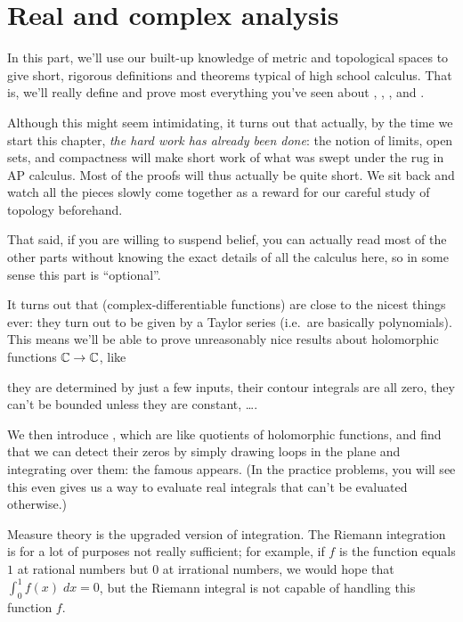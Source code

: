 \section{Real and complex analysis}
\begin{itemize}
In this part, we'll use our built-up knowledge of
metric and topological spaces to give short, rigorous definitions
and theorems typical of high school calculus.
That is, we'll really define and prove most everything you've seen about
, , , and .

Although this might seem intimidating,
it turns out that actually, by the time we start this chapter,
\emph{the hard work has already been done}:
the notion of limits, open sets, and compactness
will make short work of what was swept under the rug in AP calculus.
Most of the proofs will thus actually be quite short.
We sit back and watch all the pieces slowly come together
as a reward for our careful study of topology beforehand.

That said, if you are willing to suspend belief,
you can actually read most of the other parts
without knowing the exact details of all the calculus here,
so in some sense this part is ``optional''.

It turns out that 
(complex-differentiable functions)
are close to the nicest things ever:
they turn out to be given by a Taylor series
(i.e.\ are basically polynomials).
This means we'll be able to prove unreasonably nice results
about holomorphic functions $\mathbb C \to \mathbb C$, like
\begin{itemize}
	\ii they are determined by just a few inputs,
	\ii their contour integrals are all zero,
	\ii they can't be bounded unless they are constant,
	\ii \dots.
\end{itemize}
We then introduce ,
which are like quotients of holomorphic functions,
and find that we can detect their zeros by simply drawing
loops in the plane and integrating over them:
the famous  appears.
(In the practice problems, you will see this even gives
us a way to evaluate real integrals that can't be evaluated otherwise.)

Measure theory is the upgraded version of integration.
The Riemann integration is for a lot of purposes not really sufficient;
for example, if $f$ is the function equals $1$ at rational numbers
but $0$ at irrational numbers,
we would hope that $\int_0^1 f(x) \; dx = 0$,
but the Riemann integral is not capable of handling this function $f$.


\end{itemize}
